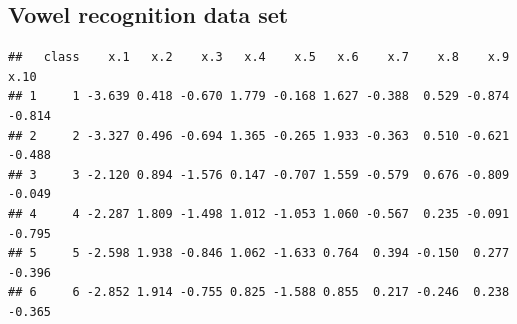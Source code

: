 \documentclass{article}\usepackage[]{graphicx}\usepackage[]{color}
\makeatletter
\newenvironment{kframe}{%
 \def\at@end@of@kframe{}%
 \ifinner\ifhmode%
  \def\at@end@of@kframe{\end{minipage}}%
  \begin{minipage}{\columnwidth}%
 \fi\fi%
 \def\FrameCommand##1{\hskip\@totalleftmargin \hskip-\fboxsep
 \colorbox{shadecolor}{##1}\hskip-\fboxsep
     \hskip-\linewidth \hskip-\@totalleftmargin \hskip\columnwidth}%
 \MakeFramed {\advance\hsize-\width
   \@totalleftmargin\z@ \linewidth\hsize
   \@setminipage}}%
 {\par\unskip\endMakeFramed%
 \at@end@of@kframe}
\newenvironment{knitrout}{}{} %
\makeatother
\begin{document}
\begin{knitrout}
{}



\end{knitrout}

\subsection{Vowel recognition data set}

\begin{knitrout}\small
{}\color{fgcolor}\begin{kframe}
\begin{verbatim}
##   class    x.1   x.2    x.3   x.4    x.5   x.6    x.7    x.8    x.9   x.10
## 1     1 -3.639 0.418 -0.670 1.779 -0.168 1.627 -0.388  0.529 -0.874 -0.814
## 2     2 -3.327 0.496 -0.694 1.365 -0.265 1.933 -0.363  0.510 -0.621 -0.488
## 3     3 -2.120 0.894 -1.576 0.147 -0.707 1.559 -0.579  0.676 -0.809 -0.049
## 4     4 -2.287 1.809 -1.498 1.012 -1.053 1.060 -0.567  0.235 -0.091 -0.795
## 5     5 -2.598 1.938 -0.846 1.062 -1.633 0.764  0.394 -0.150  0.277 -0.396
## 6     6 -2.852 1.914 -0.755 0.825 -1.588 0.855  0.217 -0.246  0.238 -0.365
\end{verbatim}
\end{kframe}
\end{knitrout}
\end{document}
